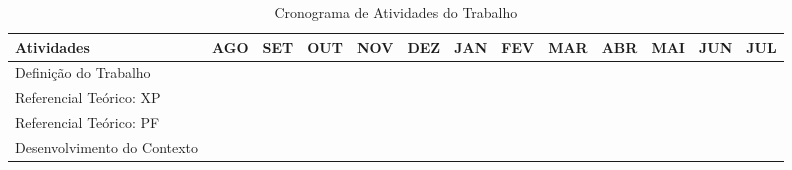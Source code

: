 \begin{table}[H]
\centering
\caption{Cronograma de Atividades do Trabalho}
\label{cronograma}
\resizebox{\textwidth}{!} {
\begin{tabular}{|l|l|l|l|l|l|l|l|l|l|l|l|l|}
\hline
\textbf{Atividades}                                                             & \textbf{AGO}             & \textbf{SET}             & \textbf{OUT}                                    & \textbf{NOV}             & \textbf{DEZ}             & \textbf{JAN}             & \textbf{FEV}             & \textbf{MAR}             & \textbf{ABR}             & \textbf{MAI}             & \textbf{JUN}             & \textbf{JUL}             \\ \hline
Definição do Trabalho                                                           & \cellcolor[HTML]{009901} &                          &                                                 &                          &                          &                          &                          &                          &                          &                          &                          &                          \\ \hline
Referencial Teórico: XP                                                         &                          & \cellcolor[HTML]{009901} & \cellcolor[HTML]{009901}                        &                          &                          &                          &                          &                          &                          &                          &                          &                          \\ \hline
Referencial Teórico: PF                                                         &                          &                          & \cellcolor[HTML]{009901}                        & {\color[HTML]{009901} }  &                          &                          &                          &                          &                          &                          &                          &                          \\ \hline
Desenvolvimento do Contexto                                                     &                          &                          & \cellcolor[HTML]{009901}                        & \cellcolor[HTML]{009901} &                          &                          &                          &                          &                          &                          &                          &                          \\ \hline

\end{tabular}}
\end{table}
